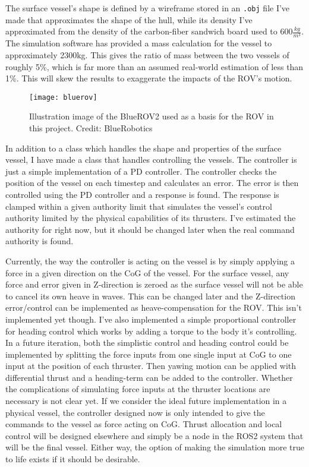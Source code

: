 The surface vessel's shape is defined by a wireframe stored in an \texttt{.obj} file I've made that approximates the shape of the hull, while its density I've approximated from the density of the carbon-fiber sandwich board used to \(600\frac{kg}{m^3}\). The simulation software has provided a mass calculation for the vessel to approximately 2300kg. This gives the ratio of mass between the two vessels of roughly 5\%, which is far more than an assumed real-world estimation of less than 1\%. This will skew the results to exaggerate the impacts of the ROV's motion. 

\begin{figure}
	\centering
	\texttt{[image: bluerov]}
	\caption{Illustration image of the BlueROV2 used as a basis for the ROV in this project. Credit: BlueRobotics}
	\label{fig:bluerov}
\end{figure}

In addition to a class which handles the shape and properties of the surface vessel, I have made a class that handles controlling the vessels. The controller is just a simple implementation of a PD controller. The controller checks the position of the vessel on each timestep and calculates an error. The error is then controlled using the PD controller and a response is found. The response is clamped within a given authority limit that simulates the vessel's control authority limited by the physical capabilities of its thrusters. 
I've estimated the authority for right now, but it should be changed later when the real command authority is found. 

Currently, the way the controller is acting on the vessel is by simply applying a force in a given direction on the CoG of the vessel. For the surface vessel, any force and error given in Z-direction is zeroed as the surface vessel will not be able to cancel its own heave in waves. This can be changed later and the Z-direction error/control can be implemented as heave-compensation for the ROV. This isn't implemented yet though. I've also implemented a simple proportional controller for heading control which works by adding a torque to the body it's controlling. In a future iteration, both the simplistic control and heading control could be implemented by splitting the force inputs from one single input at CoG to one input at the position of each thruster. Then yawing motion can be applied with differential thrust and a heading-term can be added to the controller. Whether the complications of simulating force inputs at the thruster locations are necessary is not clear yet. If we consider the ideal future implementation in a physical vessel, the controller designed now is only intended to give the commands to the vessel as force acting on CoG. Thrust allocation and local control will be designed elsewhere and simply be a node in the ROS2 system that will be the final vessel. Either way, the option of making the simulation more true to life exists if it should be desirable. 

